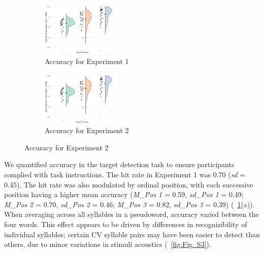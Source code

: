 \documentclass[11pt]{article}
\begin{document}
\begin{figure}
	\begin{subfigure}{\textwidth}
		\includegraphics[width=0.4\textwidth]{exp3fig4acc.pdf}
		\caption{Accuracy for Experiment 1}
	\end{subfigure} 
	\begin{subfigure}{\textwidth}
		\includegraphics[width=0.4\textwidth]{exp3fig4acc.pdf}
		\caption{Accuracy for Experiment 2}
	\end{subfigure}
	\label{fig:Fig. S2}
\end{figure}
We quantified accuracy in the target detection task to ensure participants complied
with task instructions. The hit rate in Experiment 1 was 0.70 (\textit{sd} = 0.45). 
The hit rate was also modulated by ordinal position, with each successive position
having a higher mean accuracy (\textit{M\_{Pos 1}} = 0.59, \textit{sd\_{Pos 1}} = 0.49;
\textit{M\_{Pos 2}} = 0.70, \textit{sd\_{Pos 2}} = 0.46; \textit{M\_{Pos 3}} = 0.82, \textit{sd\_{Pos 3}} = 0.39) (~\ref{fig:Fig. S2}(a)).
When averaging across all syllables in a pseudoword, accuracy varied between the 
four words. This effect appears to be driven by differences in recognizibility of
individual syllables; certain CV syllable pairs may have been easier to detect
than others, due to minor variations in stimuli acoustics (~\ref{fig:Fig. S3}). 
\end{document}
